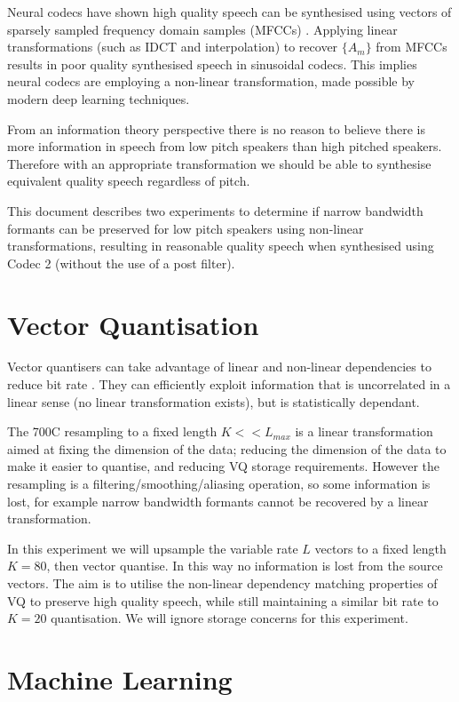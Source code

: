 \documentclass{article}
\begin{document}
Neural codecs have shown high quality speech can be synthesised using vectors of sparsely sampled frequency domain samples (MFCCs) \cite{davis1980comparison}.  Applying linear transformations (such as IDCT and interpolation) to recover $\{A_m\}$ from MFCCs results in poor quality synthesised speech in sinusoidal codecs.  This implies neural codecs are employing a non-linear transformation, made possible by modern deep learning techniques.

From an information theory perspective there is no reason to believe there is more information in speech from low pitch speakers than high pitched speakers. Therefore with an appropriate transformation we should be able to synthesise equivalent quality speech regardless of pitch.

This document describes two experiments to determine if narrow bandwidth formants can be preserved for low pitch speakers using non-linear transformations, resulting in reasonable quality speech when synthesised using Codec 2 (without the use of a post filter).  

\section{Vector Quantisation}
\label{sec:vq}

Vector quantisers can take advantage of linear and non-linear dependencies to reduce bit rate \cite{makhoul1985vector}.  They can efficiently exploit information that is uncorrelated in a linear sense (no linear transformation exists), but is statistically dependant.

The 700C resampling to a fixed length $K<<L_{max}$ is a linear transformation aimed at fixing the dimension of the data; reducing the dimension of the data to make it easier to quantise, and reducing VQ storage requirements.  However the resampling is a filtering/smoothing/aliasing operation, so some information is lost, for example narrow bandwidth formants cannot be recovered by a linear transformation.

In this experiment we will upsample the variable rate $L$ vectors to a fixed length $K=80$, then vector quantise.  In this way no information is lost from the source vectors.  The aim is to utilise the non-linear dependency matching properties of VQ to preserve high quality speech, while still maintaining a similar bit rate to $K=20$ quantisation.  We will ignore storage concerns for this experiment. 

\section{Machine Learning}
\end{document}
